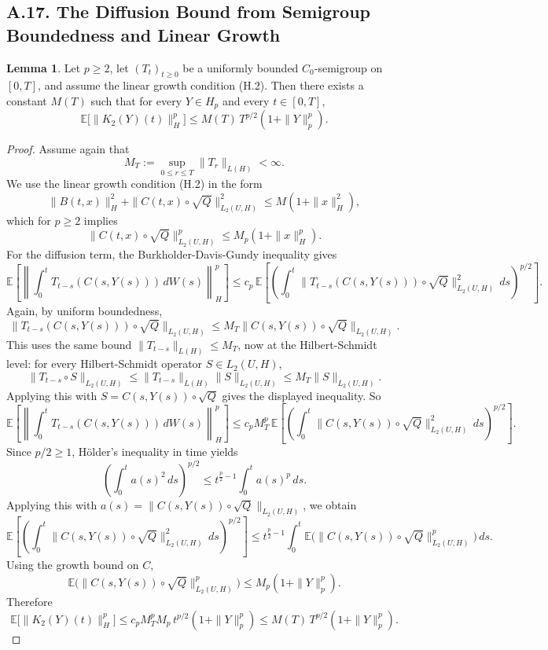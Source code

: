 \documentclass[11pt]{article}
\theoremstyle{definition}
\newtheorem{lemma}{Lemma}
\theoremstyle{remark}
\begin{document}
\subsection*{A.17. The Diffusion Bound from Semigroup Boundedness and Linear Growth}
\begin{lemma}
Let \(p\ge 2\), let \((T_t)_{t\ge 0}\) be a uniformly bounded \(C_0\)-semigroup on \([0,T]\), and assume the linear growth condition \textnormal{(H.2)}. Then there exists a constant \(M(T)\) such that for every \(Y\in H_p\) and every \(t\in[0,T]\),
\[
\mathbb E\bigl[\|K_2(Y)(t)\|_H^p\bigr]
\le
M(T)\,T^{p/2}(1+\|Y\|_p^p).
\]
\end{lemma}
\begin{proof}
Assume again that
\[
M_T:=\sup_{0\le r\le T}\|T_r\|_{L(H)}<\infty.
\]
We use the linear growth condition \textnormal{(H.2)} in the form
\[
\|B(t,x)\|_H^2+\|C(t,x)\circ \sqrt Q\|_{L_2(U,H)}^2\le M(1+\|x\|_H^2),
\]
which for \(p\ge 2\) implies
\[
\|C(t,x)\circ \sqrt Q\|_{L_2(U,H)}^p\le M_p(1+\|x\|_H^p).
\]
For the diffusion term, the Burkholder-Davis-Gundy inequality gives
\[
\mathbb E\left[\left\|\int_0^t T_{t-s}(C(s,Y(s)))\,dW(s)\right\|_H^p\right]
\le
c_p\,\mathbb E\left[\left(\int_0^t \|T_{t-s}(C(s,Y(s)))\circ \sqrt Q\|_{L_2(U,H)}^2\,ds\right)^{p/2}\right].
\]
Again, by uniform boundedness,
\[
\|T_{t-s}(C(s,Y(s)))\circ \sqrt Q\|_{L_2(U,H)}
\le
M_T\|C(s,Y(s))\circ \sqrt Q\|_{L_2(U,H)}.
\]
This uses the same bound \(\|T_{t-s}\|_{L(H)}\le M_T\), now at the Hilbert-Schmidt level: for every Hilbert-Schmidt operator \(S\in L_2(U,H)\),
\[
\|T_{t-s}\circ S\|_{L_2(U,H)}
\le
\|T_{t-s}\|_{L(H)}\|S\|_{L_2(U,H)}
\le
M_T\|S\|_{L_2(U,H)}.
\]
Applying this with \(S=C(s,Y(s))\circ \sqrt Q\) gives the displayed inequality.
So
\[
\mathbb E\left[\left\|\int_0^t T_{t-s}(C(s,Y(s)))\,dW(s)\right\|_H^p\right]
\le
c_pM_T^p\,
\mathbb E\left[\left(\int_0^t \|C(s,Y(s))\circ \sqrt Q\|_{L_2(U,H)}^2\,ds\right)^{p/2}\right].
\]
Since \(p/2\ge 1\), H\"older's inequality in time yields
\[
\left(\int_0^t a(s)^2\,ds\right)^{p/2}
\le
t^{\frac p2-1}\int_0^t a(s)^p\,ds.
\]
Applying this with \(a(s)=\|C(s,Y(s))\circ \sqrt Q\|_{L_2(U,H)}\), we obtain
\[
\mathbb E\left[\left(\int_0^t \|C(s,Y(s))\circ \sqrt Q\|_{L_2(U,H)}^2\,ds\right)^{p/2}\right]
\le
t^{\frac p2-1}\int_0^t \mathbb E\bigl(\|C(s,Y(s))\circ \sqrt Q\|_{L_2(U,H)}^p\bigr)\,ds.
\]
Using the growth bound on \(C\),
\[
\mathbb E\bigl(\|C(s,Y(s))\circ \sqrt Q\|_{L_2(U,H)}^p\bigr)
\le
M_p(1+\|Y\|_p^p).
\]
Therefore
\[
\mathbb E\bigl[\|K_2(Y)(t)\|_H^p\bigr]
\le
c_pM_T^pM_p\,t^{p/2}(1+\|Y\|_p^p)
\le
M(T)\,T^{p/2}(1+\|Y\|_p^p).
\]
\end{proof}
\end{document}
